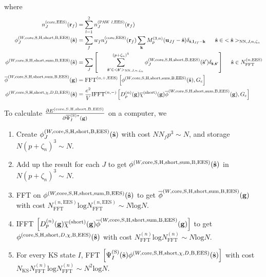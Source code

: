 \documentclass[paper=a4, fontsize=11pt]{article} %
\numberwithin{equation}{section} %
\numberwithin{figure}{section} %
\numberwithin{table}{section} %
\newcommand{\p}{\partial}
\newcommand{\ol}{\overline}
\newcommand{\bu}{{\bf{u}}}
\newcommand{\bl}{{\bf{l}}}
\newcommand{\bk}{{\bf{k}}}
\newcommand{\bs}{{\bf{s}}}
\newcommand{\bg}{{\bf{g}}}
\newcommand{\br}{{\bf{r}}}
\newcommand{\hs}{{\hat{\bf{s}}}}
\newcommand{\rS}{{\mathrm{S}}}
\newcommand{\rEES}{{\mathrm{EES}}}
\newcommand{\rcore}{{\mathrm{core}}}
\newcommand{\rNN}{{\mathrm{NN}}}
\newcommand{\rshort}{{\mathrm{short}}}
\newcommand{\rP}{{\mathrm{PAW}}}
\newcommand{\rH}{{\mathrm{H}}}
\newcommand{\rB}{{\mathrm{B}}}
\newcommand{\rsum}{{\mathrm{sum}}}
\newcommand{\rl}{{\mathrm{log}}}
\newcommand{\psigsc}{{\overline \Psi_I^{(\rS)*}(\bg)}}
\newcommand{\NKS}{{N_{\mathrm{KS}}}}
\newcommand{\NFFTn}{{N^{(n)}_{\mathrm{FFT}}}}
\newcommand{\NFFTnEES}{{N^{(n,\rEES)}_{\mathrm{FFT}}}}
\newcommand{\Gc}{{G_{\mathrm{c}}}}
\newcommand{\Dng}{{D^{(n)}_p(\bg)}}
\newcommand{\Mn}{{M_p^{(3,n)}}}
\newcommand{\FFTnEES}{{\mathrm{FFT}^{(n,+,\rEES)}}}
\newcommand{\IFFTni}{{\mathrm{IFFT}^{(n,-)}}}
\newcommand{\pzn}{{(p+\zeta_n)^3}}
\newcommand{\hsJn}{{<\hs>_{\rNN,J,n,\zeta_n}}}
\newcommand{\hsinJn}{{\ \ \ \ \ \hs  \in  \hsJn}}
\newcommand{\hspJn}{{<\hs'>_{\rNN,J,n,\zeta_n}}}
\newcommand{\hspinJn}{{\ \ \ \ \ \hs'  \in  \hspJn}}
\newcommand{\hsinnEES}{{\ \ \ \ \hs \in \NFFTnEES}}
\begin{document}
where
\begin{equation}
\begin{split}
n_J^{(\rcore,\rEES)}(\br_f)&=\sum_{l=1}^2 n_J^{(\rP\ l,\rEES)}(\br_f)\\
\phi_J^{(W,\rcore,\rS,\rH,\rshort,\rB,\rEES)}(\hs) & = \sum_f w_f n_J^{(\rcore,\rEES)}(\br_f) \sum_{\bk} \Mn(\bu_{Jf}-\hat \bs)\delta_{\hat \bs,\bl_{Jf}-\bk} \hsinJn\\
\phi^{(W,\rcore,\rS,\rH,\rshort,\rsum,\rB,\rEES)}(\hs) & = \sum_J \left[\sum_{\hspinJn}^\pzn \phi_J^{(W,\rcore,\rS,\rH,\rshort,\rB,\rEES)}(\hs') \delta_{\hs,\hs'}\right] \hsinnEES\\
\ol \phi^{(W,\rcore,\rS,\rH,\rshort,\rsum,\rB,\rEES)}(\bg) &= \FFTnEES \left[\phi^{(W,\rcore,\rS,\rH,\rshort,\rsum,\rB,\rEES)}(\hs),\Gc\right]\\
\phi^{(W,\rcore,\rS,\rH,\rshort,\chi,D,\rB,\rEES)}(\hs) &= \frac{e^2}{V} \IFFTni \left[\Dng \ol \chi^{(\rshort)}(\bg) \ol \phi^{(W,\rcore,\rS,\rH,\rshort,\rsum,\rB,\rEES)}(\bg) ,\Gc\right] \\
\end{split}
\end{equation}

To calculate $\frac{\p E^{(\rcore,\rS,\rH,\rshort,\rB,\rEES)}}{\p \psigsc}$ on a computer, we
\begin{enumerate}
\item Create $\phi_J^{(W,\rcore,\rS,\rH,\rshort,\rB,\rEES)}(\hs)$ with cost $N N_f p^3  \sim N $, and storage $N \pzn \sim N$.
\item Add up the result for each $J$ to get $\phi^{(W,\rcore,\rS,\rH,\rshort,\rsum,\rB,\rEES)}(\hs)$ in $N \pzn \sim N$.
\item FFT on $\phi^{(W,\rcore,\rS,\rH,\rshort,\rsum,\rB,\rEES)}(\hs)$ to get $\ol \phi^{(W,\rcore,\rS,\rH,\rshort,\rsum,\rB,\rEES)}(\bg)$ with cost $\NFFTnEES \rl \NFFTnEES \sim N \rl N$.
\item IFFT $\left[ \Dng \ol \chi^{(\rshort)}(\bg) \ol \phi^{(W,\rcore,\rS,\rH,\rshort,\rsum,\rB,\rEES)}(\bg) \right]$ to get $\phi^{(\rcore,\rS,\rH,\rshort,D,\chi,\rB,\rEES)}(\hs)$ with cost $\NFFTn \rl \NFFTn \sim N \rl N$.
\item For every KS state $I$, FFT $\left[ \Psi_{I}^{(\rS)}(\hat \bs)\phi^{(W,\rcore,\rS,\rH,\rshort,\chi,D,\rB,\rEES)}(\hs) \right]$ with cost $\NKS\NFFTn \rl \NFFTn \sim N^2 \rl N$.
\end{enumerate}
\end{document}
